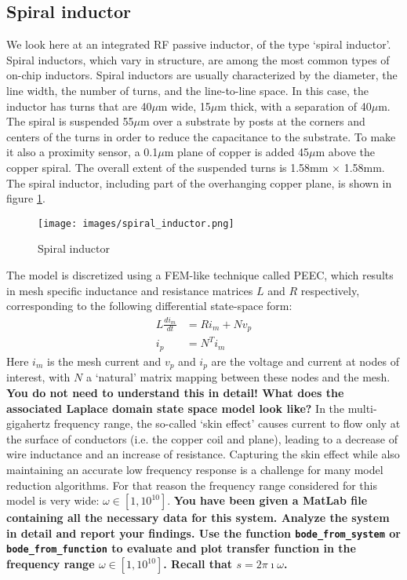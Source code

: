 \documentclass{article}
\begin{document}
	\subsection{Spiral inductor}
	We look here at an integrated RF passive inductor, of the type `spiral inductor'. Spiral inductors, which vary in structure, are among the most common types of on-chip inductors. Spiral inductors are usually characterized by the diameter, the line width, the number of turns, and the line-to-line space. In this case, the inductor has turns that are 40$\mu$m wide, 15$\mu$m thick, with a separation of 40$\mu$m. The spiral is suspended 55$\mu$m over a substrate by posts at the corners and centers of the turns in order to reduce the capacitance to the substrate. To make it also a proximity sensor, a 0.1$\mu$m plane of copper is added 45$\mu$m above the copper spiral.
	The overall extent of the suspended turns is 1.58mm × 1.58mm. The spiral inductor, including
	part of the overhanging copper plane, is shown in figure \ref{fig:PEEC}. 
	\begin{figure}[h]
		\center
		\texttt{[image: images/spiral\_inductor.png]}
		\caption{Spiral inductor}\label{fig:PEEC}
	\end{figure}
	The model is discretized using a FEM-like technique called PEEC, which results in mesh specific inductance and resistance matrices $L$ and $R$ respectively, corresponding to the following differential state-space form:
	\begin{align*}
		L\frac{di_m}{dt}&=Ri_m+Nv_p\\
		i_p&=N^Ti_m
	\end{align*}
	Here $i_m$ is the mesh current and $v_p$ and $i_p$ are the voltage and current at nodes of interest, with $N$ a `natural' matrix mapping between these nodes and the mesh. \textbf{You do not need to understand this in detail! What does the associated Laplace domain state space model look like?} In the multi-gigahertz frequency range, the so-called `skin effect' causes current to
	flow only at the surface of conductors (i.e. the copper coil and plane), leading to a decrease of wire
	inductance and an increase of resistance. Capturing the skin eﬀect while also maintaining an accurate low frequency response is a challenge for many model reduction algorithms. For that reason the frequency range considered for this model is very wide: $\omega\in[1,10^{10}]$.
	\textbf{You have been given a MatLab file containing all the necessary data for this system. Analyze the system in detail and report your findings. Use the function \texttt{bode\_from\_system} or \texttt{bode\_from\_function} to evaluate and plot transfer function in the frequency range $\omega\in [1,10^{10}] $. Recall that $s=2\pi\imath\omega$.}
	
\FloatBarrier
\pagebreak
\printbibliography
\end{document}
